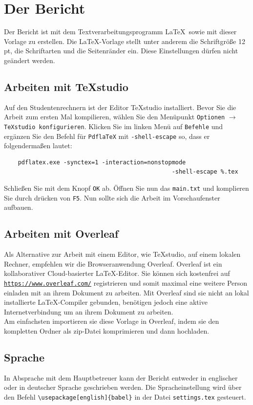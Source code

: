 \chapter{Der Bericht}\label{chap:Bericht}
Der Bericht ist mit dem Textverarbeitungsprogramm \LaTeX~sowie mit dieser Vorlage zu erstellen. Die \LaTeX-Vorlage stellt unter anderem die Schriftgrö{\ss}e 12\,pt, die Schriftarten und die Seitenränder ein. Diese Einstellungen dürfen nicht geändert werden.

\section{Arbeiten mit TeXstudio}
Auf den Studentenrechnern ist der Editor TeXstudio installiert. Bevor Sie die Arbeit zum ersten Mal kompilieren, wählen Sie den Menüpunkt \verb"Optionen" $\to$ \verb"TeXstudio konfigurieren". Klicken Sie im linken Menü auf \verb"Befehle" und ergänzen Sie den Befehl für  \verb"PdflaTeX" mit \verb|-shell-escape| so, dass er folgenderma\ss en lautet:

\begin{verbatim}
	pdflatex.exe -synctex=1 -interaction=nonstopmode
	                                            -shell-escape %.tex
\end{verbatim}
Schließen Sie mit dem Knopf \verb"OK" ab. Öffnen Sie nun das \verb"main.txt" und komplieren Sie durch drücken von \verb"F5". Nun sollte sich die Arbeit im Vorschaufenster aufbauen.

\section{Arbeiten mit Overleaf}
Als Alternative zur Arbeit mit einem Editor, wie TeXstudio, auf einem lokalen Rechner, empfehlen wir die Browseranwendung Overleaf. Overleaf ist ein kollaborativer Cloud-basierter \LaTeX-Editor. Sie können sich kostenfrei auf \href{https://www.overleaf.com/}{\verb"https://www.overleaf.com/"} registrieren und somit maximal eine weitere Person einladen mit an ihrem Dokument zu arbeiten. Mit Overleaf sind sie nicht an lokal installierte \LaTeX-Compiler gebunden, benötigen jedoch eine aktive Internetverbindung um an ihrem Dokument zu arbeiten.\\
Am einfachsten importieren sie diese Vorlage in Overleaf, indem sie den kompletten Ordner als zip-Datei komprimieren und dann hochladen.

\section{Sprache}
In Absprache mit dem Hauptbetreuer kann der Bericht entweder in englischer oder in deutscher Sprache geschrieben werden. Die Spracheinstellung wird über den Befehl \verb"\usepackage[english]{babel}" in der Datei \verb"settings.tex" gesteuert.

